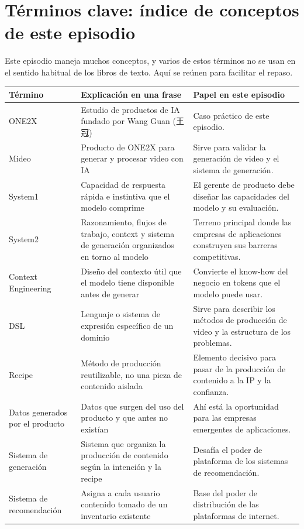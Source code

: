 \section{Términos clave: índice de conceptos de este episodio}

Este episodio maneja muchos conceptos, y varios de estos términos no se usan en el sentido habitual de los libros de texto. Aquí se reúnen para facilitar el repaso.

\begin{longtable}{p{}p{}p{}}
\toprule
Término & Explicación en una frase & Papel en este episodio \\
\midrule
ONE2X & Estudio de productos de IA fundado por Wang Guan (王冠) & Caso práctico de este episodio. \\
Mideo & Producto de ONE2X para generar y procesar video con IA & Sirve para validar la generación de video y el sistema de generación. \\
System1 & Capacidad de respuesta rápida e instintiva que el modelo comprime & El gerente de producto debe diseñar las capacidades del modelo y su evaluación. \\
System2 & Razonamiento, flujos de trabajo, context y sistema de generación organizados en torno al modelo & Terreno principal donde las empresas de aplicaciones construyen sus barreras competitivas. \\
Context Engineering & Diseño del contexto útil que el modelo tiene disponible antes de generar & Convierte el know-how del negocio en tokens que el modelo puede usar. \\
DSL & Lenguaje o sistema de expresión específico de un dominio & Sirve para describir los métodos de producción de video y la estructura de los problemas. \\
Recipe & Método de producción reutilizable, no una pieza de contenido aislada & Elemento decisivo para pasar de la producción de contenido a la IP y la confianza. \\
Datos generados por el producto & Datos que surgen del uso del producto y que antes no existían & Ahí está la oportunidad para las empresas emergentes de aplicaciones. \\
Sistema de generación & Sistema que organiza la producción de contenido según la intención y la recipe & Desafía el poder de plataforma de los sistemas de recomendación. \\
Sistema de recomendación & Asigna a cada usuario contenido tomado de un inventario existente & Base del poder de distribución de las plataformas de internet. \\

\end{longtable}
